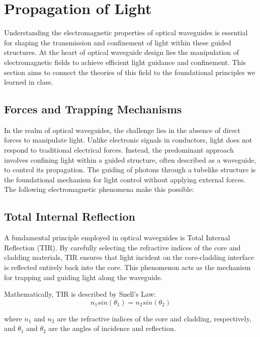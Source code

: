 \documentclass[10pt]{article}
\begin{document}
\section{Propagation of Light}

Understanding the electromagnetic properties of optical waveguides is essential for 
shaping the transmission and confinement of light within these guided structures. 
At the heart of optical waveguide design lies the manipulation of electromagnetic 
fields to achieve efficient light guidance and confinement. This section aims to connect the 
theories of this field to the foundational principles we learned in class.

\subsection{Forces and Trapping Mechanisms}

In the realm of optical waveguides, the challenge lies in the absence of direct forces to manipulate light. 
Unlike electronic signals in conductors, light does not respond to traditional electrical forces. 
Instead, the predominant approach involves confining light within a guided structure, often described as a waveguide, 
to control its propagation. The guiding of photons through a tubelike structure is the foundational mechanism for light control without 
applying external forces. The following electromagnetic phenomena make this possible:

\subsection{Total Internal Reflection}
A fundamental principle employed in optical waveguides is Total Internal Reflection (TIR). By carefully selecting the refractive indices of the core and cladding materials, TIR ensures that light incident on the core-cladding interface is reflected entirely back into the core. This phenomenon acts as the mechanism for trapping and guiding light along the waveguide.

Mathematically, TIR is described by Snell's Law:
\begin{equation}
    n_{1} sin(\theta_{1}) = n_{2} sin(\theta_{2})
\end{equation}

where $n_{1}$ and $n_{2}$ are the refractive indices of the core and cladding, respectively, and $\theta_{1}$ and $\theta_{2}$ are 
the angles of incidence and reflection.
\end{document}
